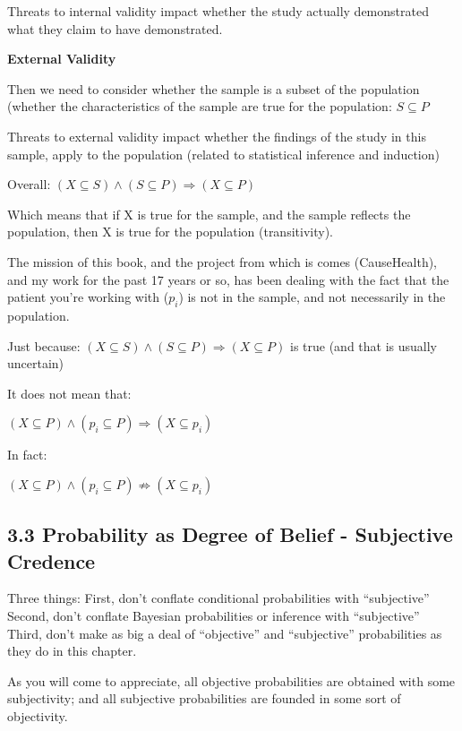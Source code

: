 \documentclass[
]{book}
\begin{document}
Threats to internal validity impact whether the study actually demonstrated what they claim to have demonstrated.

\textbf{External Validity}

Then we need to consider whether the sample is a subset of the population (whether the characteristics of the sample are true for the population: \(S \subseteq P\)

Threats to external validity impact whether the findings of the study in this sample, apply to the population (related to statistical inference and induction)

Overall: \((X \subseteq S) \land (S \subseteq P) \Rightarrow (X \subseteq P)\)

Which means that if X is true for the sample, and the sample reflects the population, then X is true for the population (transitivity).

The mission of this book, and the project from which is comes (CauseHealth), and my work for the past 17 years or so, has been dealing with the fact that the patient you're working with (\(p_i\)) is not in the sample, and not necessarily in the population.

Just because: \((X \subseteq S) \land (S \subseteq P) \Rightarrow (X \subseteq P)\) is true (and that is usually uncertain)

It does not mean that:

\((X \subseteq P) \land (p_i \subseteq P) \Rightarrow (X \subseteq p_i)\)

In fact:

\((X \subseteq P) \land (p_i \subseteq P) \nRightarrow (X \subseteq p_i)\)

\hypertarget{probability-as-degree-of-belief---subjective-credence}{%
\subsection{3.3 Probability as Degree of Belief - Subjective Credence}\label{probability-as-degree-of-belief---subjective-credence}}

Three things:
First, don't conflate conditional probabilities with ``subjective''
Second, don't conflate Bayesian probabilities or inference with ``subjective''
Third, don't make as big a deal of ``objective'' and ``subjective'' probabilities as they do in this chapter.

As you will come to appreciate, all objective probabilities are obtained with some subjectivity; and all subjective probabilities are founded in some sort of objectivity.
\end{document}
